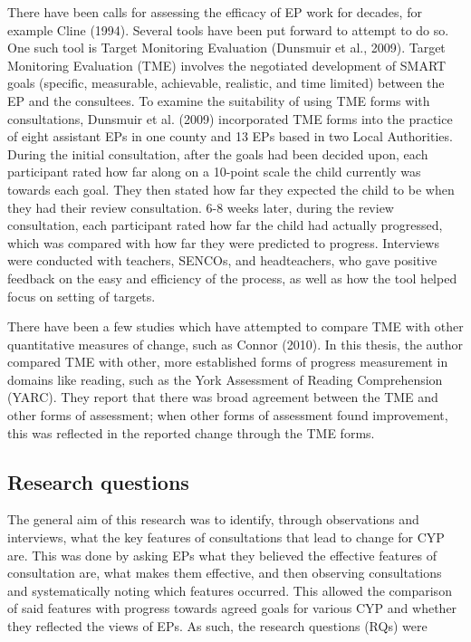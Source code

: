 \documentclass[
  english,
  man,floatsintext]{apa6}
\begin{document}
There have been calls for assessing the efficacy of EP work for decades, for example Cline (1994). Several tools have been put forward to attempt to do so. One such tool is Target Monitoring Evaluation (Dunsmuir et al., 2009). Target Monitoring Evaluation (TME) involves the negotiated development of SMART
goals (specific, measurable, achievable, realistic, and time limited)
between the EP and the consultees. To examine the suitability of using
TME forms with consultations, Dunsmuir et al. (2009)
incorporated TME forms into the practice of eight assistant EPs in one
county and 13 EPs based in two Local Authorities. During the initial
consultation, after the goals had been decided upon, each participant
rated how far along on a 10-point scale the child currently was towards
each goal. They then stated how far they expected the child to be when
they had their review consultation. 6-8 weeks later, during the review
consultation, each participant rated how far the child had actually
progressed, which was compared with how far they were predicted to
progress. Interviews were conducted with teachers, SENCOs, and
headteachers, who gave positive feedback on the easy and efficiency of
the process, as well as how the tool helped focus on setting of targets.

There have been a few studies which have attempted to compare TME with
other quantitative measures of change, such as
Connor (2010). In this thesis, the author
compared TME with other, more established forms of progress measurement
in domains like reading, such as the York Assessment of Reading
Comprehension (YARC). They report that there was broad agreement between
the TME and other forms of assessment; when other forms of assessment
found improvement, this was reflected in the reported change through the
TME forms.

\hypertarget{research-questions}{%
\subsection{Research questions}\label{research-questions}}

The general aim of this
research was to identify, through observations and interviews, what the key
features of consultations that lead to change for CYP are. This was done by
asking EPs what they believed the effective features of consultation are, what
makes them effective, and then observing consultations and systematically
noting which features occurred. This allowed the comparison of said features
with progress towards agreed goals for various CYP and whether they
reflected the views of EPs. As such, the research questions (RQs) were
\end{document}
